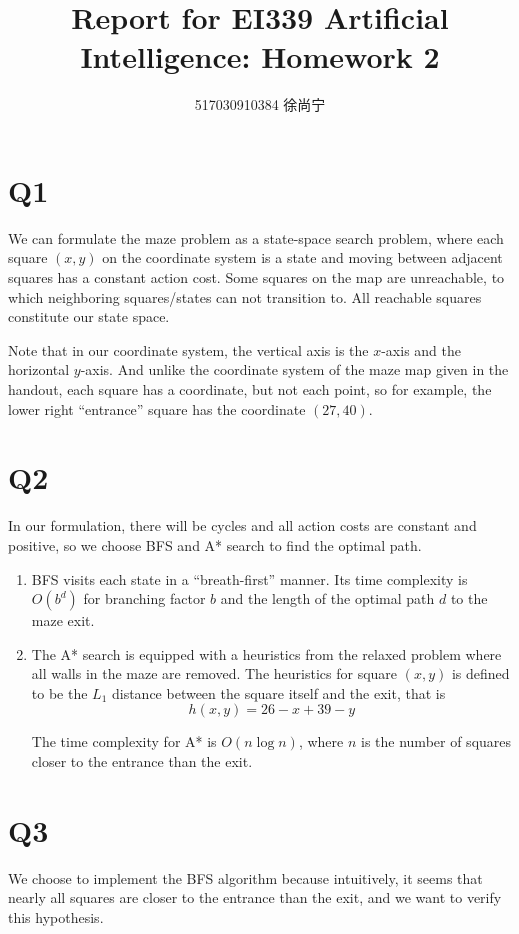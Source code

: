 \documentclass[a4paper]{article}
\title{Report for EI339 Artificial Intelligence: Homework 2}
\author{517030910384 徐尚宁}
\date{}
\begin{document}
\begin{CJK}{UTF8}{gbsn}
    \maketitle
\end{CJK}

\section*{Q1}

We can formulate the maze problem as a state-space search problem, where each
square $(x, y)$ on the coordinate system is a state and moving between adjacent
squares has a constant action cost. Some squares on the map are unreachable, to
which neighboring squares/states can not transition to. All reachable squares
constitute our state space.

Note that in our coordinate system, the vertical axis is the $x$-axis and the
horizontal $y$-axis. And unlike the coordinate system of the maze map given in
the handout, each square has a coordinate, but not each point, so for example,
the lower right ``entrance'' square has the coordinate $(27, 40)$.

\section*{Q2}

In our formulation, there will be cycles and all action costs are constant and
positive, so we choose BFS and A* search to find the optimal path.
\begin{enumerate}
    \item BFS visits each state in a ``breath-first'' manner. Its time
    complexity is $O(b^d)$ for branching factor $b$ and the length of the
    optimal path $d$ to the maze exit.
    \item The A* search is equipped with a heuristics from the relaxed problem
    where all walls in the maze are removed. The heuristics for square $(x, y)$
    is defined to be the $L_1$ distance between the square itself and the exit,
    that is
    \[
        h(x, y) = 26 - x + 39 - y
    \]

    The time complexity for A* is $O(n\log n)$, where $n$ is the number of
    squares closer to the entrance than the exit.
\end{enumerate}

\section*{Q3}

We choose to implement the BFS algorithm because intuitively, it seems that
nearly all squares are closer to the entrance than the exit, and we want to
verify this hypothesis.
\end{document}
